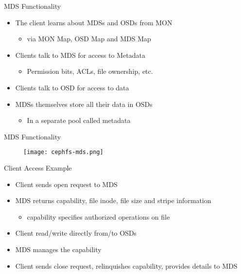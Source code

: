 \begin{frame}{MDS Functionality}
    \begin{itemize}
        \item The client learns about MDSs and OSDs from MON
            \begin{itemize}
                \item via MON Map, OSD Map and MDS Map
            \end{itemize}
        \item Clients talk to MDS for access to Metadata
            \begin{itemize}
                \item Permission bits, ACLs, file ownership, etc.
            \end{itemize}
        \item Clients talk to OSD for access to data
        \item MDSs themselves store all their data in OSDs
            \begin{itemize}
                \item In a separate pool called metadata
            \end{itemize}
    \end{itemize}
\end{frame}

\begin{frame}{MDS Functionality}
    \begin{figure}[htpb]
        \centering
        \texttt{[image: cephfs-mds.png]}
    \end{figure}
\end{frame}

\begin{frame}{Client Access Example}
    \begin{itemize}
        \item Client sends open request to MDS
        \item MDS returns capability, file inode, file size and stripe information
            \begin{itemize}
                \item capability specifies authorized operations on file
            \end{itemize}
        \item Client read/write directly from/to OSDs
        \item MDS manages the capability
        \item Client sends close request, relinquishes capability, provides details to MDS
    \end{itemize}
\end{frame}

